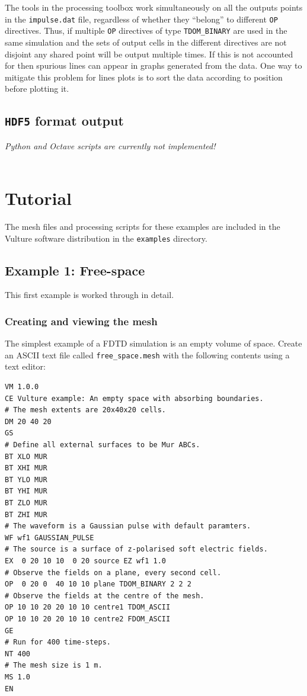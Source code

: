 \documentclass[onecolumn,a4paper]{article}
\numberwithin{equation}{section}
\begin{document}
The tools in the processing toolbox work simultaneously on all the outputs points
in the \texttt{impulse.dat} file, regardless of whether they ``belong'' to different
\texttt{OP} directives. Thus, if multiple \texttt{OP} directives of type \texttt{TDOM\_BINARY} are
used in the same simulation and the sets of output cells in the different directives
are not disjoint any shared point will be output multiple times. If this is not accounted for 
then spurious lines can appear in graphs generated from the data. One way to mitigate this 
problem for lines plots is to sort the data according to position before plotting it.

\subsection{\texttt{HDF5} format output}

{\color{red}\it Python and Octave scripts are currently not implemented!\\ \\}

%
%
\section{Tutorial}
%
%

The mesh files and processing scripts for these examples are included in the Vulture software
distribution in the \texttt{examples} directory.

\subsection{Example 1: Free-space}

This first example is worked through in detail.

\subsubsection{Creating and viewing the mesh}

The simplest example of a FDTD simulation is an empty volume of space. 
Create an ASCII text file called \texttt{free\_space.mesh} with the 
following contents using a text editor:
\begin{verbatim}
VM 1.0.0
CE Vulture example: An empty space with absorbing boundaries.
# The mesh extents are 20x40x20 cells.
DM 20 40 20
GS
# Define all external surfaces to be Mur ABCs.
BT XLO MUR
BT XHI MUR
BT YLO MUR
BT YHI MUR
BT ZLO MUR
BT ZHI MUR
# The waveform is a Gaussian pulse with default paramters.
WF wf1 GAUSSIAN_PULSE
# The source is a surface of z-polarised soft electric fields.
EX  0 20 10 10  0 20 source EZ wf1 1.0
# Observe the fields on a plane, every second cell.
OP  0 20 0  40 10 10 plane TDOM_BINARY 2 2 2
# Observe the fields at the centre of the mesh.
OP 10 10 20 20 10 10 centre1 TDOM_ASCII
OP 10 10 20 20 10 10 centre2 FDOM_ASCII
GE
# Run for 400 time-steps.
NT 400 
# The mesh size is 1 m.
MS 1.0
EN
\end{verbatim}
\end{document}
